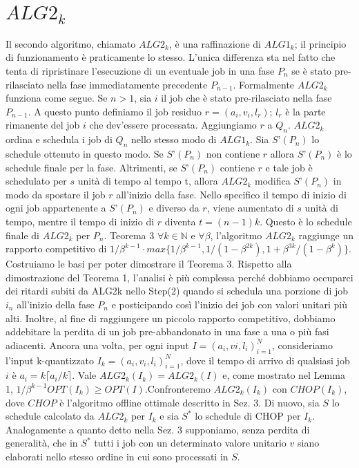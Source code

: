 \documentclass[12pt]{article}
\newcommand*{\N}{\mathbb{N}}
\begin{document}
\section{$ALG2_{k}$}
Il secondo algoritmo, chiamato $ALG2_{k}$, è una raffinazione di $ALG1_{k}$; il principio di funzionamento è praticamente lo stesso. L’unica differenza sta nel fatto che tenta di ripristinare l’esecuzione di un eventuale job in una fase $P_{n}$ se è stato pre-rilasciato nella fase immediatamente precedente $P_{n-1}$. Formalmente $ALG2_{k}$ funziona come segue. Se $n > 1$, sia $i$ il job che è stato pre-rilasciato nella fase $P_{n-1}$. A questo punto definiamo il job residuo $r = (a_{i}, v_{i}, l_{r})$; $l_{r}$ è la parte rimanente del job $i$ che dev’essere processata. Aggiungiamo $r$ a $Q_{n}$. $ALG2_{k}$ ordina e schedula i job di $Q_{n}$ nello stesso modo di $ALG1_{k}$. Sia $S’(P_{n})$ lo schedule ottenuto in questo modo. Se $S’(P_{n})$ non contiene $r$ allora $S’(P_{n})$ è lo schedule finale per la fase. Altrimenti, se $S’(P_{n})$ contiene $r$ e tale job è schedulato per $s$ unità di tempo al tempo t, allora $ALG2_{k}$ modifica $S’(P_{n})$ in modo da spostare il job $r$ all’inizio della fase. Nello specifico il tempo di inizio di ogni job appartenente a $S’(P_{n})$ e diverso da $r$, viene aumentato di $s$ unità di tempo, mentre il tempo di inizio di $r$ diventa $t = (n-1)k$. Questo è lo schedule finale di $ALG2_{k}$ per $P_{n}$.
Teorema 3
$\forall k \in \N$ e $\forall \beta$, l'algoritmo $ALG2_{k}$ raggiunge un rapporto competitivo di $1 / \beta^{k - 1} \cdot max \{1 / \beta^{k - 1}, 1 / (1 - \beta^{2k}), 1 + \beta^{3k} / (1 - \beta^{k})\}$.
Costruiamo le basi per poter dimostrare il Teorema 3. Rispetto alla dimostrazione del Teorema 1, l'analisi è più complessa perché dobbiamo occuparci dei ritardi subiti da ALG2k nello Step(2) quando si schedula una porzione di job $i_{n}$ all'inizio della fase $P_{n}$ e posticipando così l'inizio dei job con valori unitari più alti. Inoltre, al fine di raggiungere un piccolo rapporto competitivo, dobbiamo addebitare la perdita di un job pre-abbandonato in una fase a una o più fasi adiacenti.
Ancora una volta, per ogni input $I = (a_{i}, v{i}, l_{i})^{N}_{i = 1}$, consideriamo l'input k-quantizzato $I_{k} =(a_{i}, v_{i}, l_{i})^{N}_{i = 1}$, dove il tempo di arrivo di qualsiasi job $i$ è $a_{i} = k \lceil a_{i}/k \rceil$. Vale $ALG2_{k}(I_{k}) = ALG2_{k}(I)$ e, come mostrato nel Lemma 1, $1 / \beta^{k-1} OPT (I_{k}) \geq OPT(I)$.Confronteremo $ALG2_{k}(I_{k})$ con $CHOP(I_{k})$, dove $CHOP$ è l'algoritmo offline ottimale descritto in Sez. 3. Di nuovo, sia $S$ lo schedule calcolato da $ALG2_{k}$ per $I_{k}$ e sia $S^{*}$ lo schedule di CHOP per $I_{k}$. Analogamente a quanto detto nella Sez. 3 supponiamo, senza perdita di generalità, che in $S^{*}$ tutti i job con un determinato valore unitario $v$ siano elaborati nello stesso ordine in cui sono processati in $S$.
\end{document}
